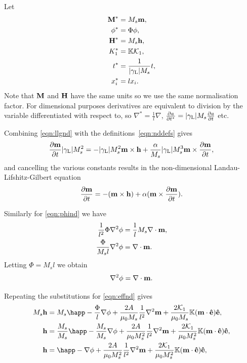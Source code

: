 Let
\begin{equation}
  \label{eqn:nddefs}
  \begin{aligned}
    \boldsymbol{\mathrm{M}}^* &= M_s \boldsymbol{\mathrm{m}},  \\
    \phi^* &= \Phi \phi,  \\
    \boldsymbol{\mathrm{H}}^* &= M_s \boldsymbol{\mathrm{h}},  \\
    K_1^* &= \mathbb{K} \mathcal{K}_1,  \\
    t^* &= \frac{1}{{\left|{\gamma_{\mathrm{\tiny{L}}}} \right|} M_s} t,  \\
    x_i^* &= l x_i.
  \end{aligned}
\end{equation}
Note that $\boldsymbol{\mathrm{M}}$ and $\boldsymbol{\mathrm{H}}$ have the same units so we use the same normalisation factor. For dimensional purposes derivatives are equivalent to division by the variable differentiated with respect to, so $\nabla^* = \frac{1}{l} \nabla$, $\frac{\partial a}{\partial t^*} = {\left|{\gamma_{\mathrm{\tiny{L}}}} \right|} M_s \frac{\partial a}{\partial t}$ etc.

Combining \cref{eqn:llgnd} with the definitions~\cref{eqn:nddefs} gives
\begin{equation}
   \frac{\partial \boldsymbol{\mathrm{m}}}{\partial t} {\left|{\gamma_{\mathrm{\tiny{L}}}} \right|} M_s^2 =
  - {\left|{\gamma_{\mathrm{\tiny{L}}}} \right|} M_s^2 \boldsymbol{\mathrm{m}} \times \boldsymbol{\mathrm{h}} + \frac{\alpha}{M_s} {\left|{\gamma_{\mathrm{\tiny{L}}}} \right|} M_s^3 \boldsymbol{\mathrm{m}} \times \frac{\partial \boldsymbol{\mathrm{m}}}{\partial t},
\end{equation}
and cancelling the various constants results in the non-dimensional Landau-Lifshitz-Gilbert equation
\begin{equation}
  \label{eq:53}
  \frac{\partial \boldsymbol{\mathrm{m}}}{\partial t} = - (\boldsymbol{\mathrm{m}} \times \boldsymbol{\mathrm{h}}) + \alpha (\boldsymbol{\mathrm{m}} \times \frac{\partial \boldsymbol{\mathrm{m}}}{\partial t}).
\end{equation}

Similarly for \cref{eqn:phind} we have
\begin{align*}
  \frac{1}{l^2} \Phi \nabla^2 \phi &= \frac{1}{l} M_s \nabla \cdot \boldsymbol{\mathrm{m}}, \\
  \frac{\Phi}{M_s l} \nabla^2 \phi &= \nabla \cdot \boldsymbol{\mathrm{m}}.
\end{align*}
Letting $\Phi = M_s l$ we obtain
\begin{equation}
  \label{eq:57}
  \nabla^2 \phi = \nabla \cdot \boldsymbol{\mathrm{m}}.
\end{equation}

Repeating the substitutions for \cref{eqn:effnd} gives
\begin{align*}
  M_s \hv &= M_s \happ - \frac{\Phi}{l} \grad \phi + \frac{2 \Exchc }{\mu_0 M_s} \frac{1}{l^2} \lap \mv + \frac{2\kone}{\mu_0 M_s}  \nK (\mv \cdot \ev) \ev, \\
  \hv &= \frac{M_s}{M_s} \happ - \frac{M_s}{M_s} \grad \phi + \frac{2 \Exchc}{\mu_0 M_s^2} \frac{1}{l^2} \lap \mv + \frac{2\kone}{\mu_0 M_s^2} \nK (\mv \cdot \ev) \ev, \\
  \hv &= \happ - \grad \phi + \frac{2 \Exchc}{\mu_0 M_s^2} \frac{1}{l^2} \lap \mv + \frac{2\kone}{\mu_0 M_s^2} \nK (\mv \cdot \ev) \ev, \\
\end{align*}

